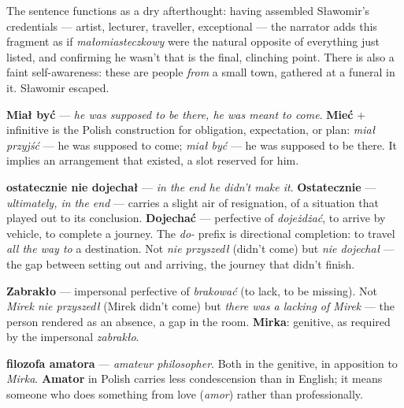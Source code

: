 The sentence functions as a dry afterthought: having assembled
Sławomir's credentials --- artist, lecturer, traveller, exceptional ---
the narrator adds this fragment as if \textit{małomiasteczkowy} were
the natural opposite of everything just listed, and confirming he
wasn't that is the final, clinching point. There is also a faint
self-awareness: these are people \textit{from} a small town, gathered
at a funeral in it. Sławomir escaped.



\textbf{Miał być} --- \textit{he was supposed to be there, he was
meant to come}. \textbf{Mieć} + infinitive is the Polish construction
for obligation, expectation, or plan: \textit{miał przyjść} --- he was
supposed to come; \textit{miał być} --- he was supposed to be there.
It implies an arrangement that existed, a slot reserved for him.

\textbf{ostatecznie nie dojechał} --- \textit{in the end he didn't
make it}. \textbf{Ostatecznie} --- \textit{ultimately, in the end} ---
carries a slight air of resignation, of a situation that played out to
its conclusion. \textbf{Dojechać} --- perfective of \textit{dojeżdżać},
to arrive by vehicle, to complete a journey. The \textit{do-} prefix
is directional completion: to travel \textit{all the way to} a
destination. Not \textit{nie przyszedł} (didn't come) but \textit{nie
dojechał} --- the gap between setting out and arriving, the journey
that didn't finish.



\textbf{Zabrakło} --- impersonal perfective of \textit{brakować} (to
lack, to be missing). Not \textit{Mirek nie przyszedł} (Mirek didn't
come) but \textit{there was a lacking of Mirek} --- the person rendered
as an absence, a gap in the room. \textbf{Mirka}: genitive, as required
by the impersonal \textit{zabrakło}.

\textbf{filozofa amatora} --- \textit{amateur philosopher}. Both in
the genitive, in apposition to \textit{Mirka}. \textbf{Amator} in
Polish carries less condescension than in English; it means someone
who does something from love (\textit{amor}) rather than
professionally.

